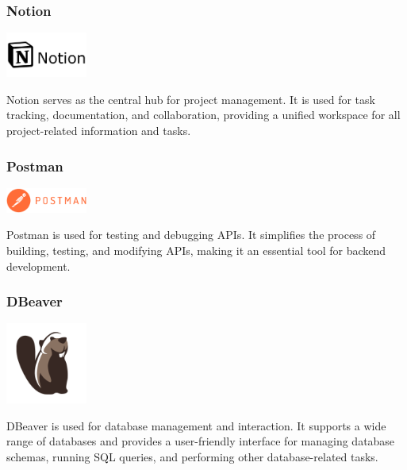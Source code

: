\subsubsection*{Notion}
\begin{center}
\includegraphics[width=0.2\textwidth]{Images/logos/62cc159e150d5de9a3dad5ec.png}
\label{fig:notion}
\end{center}
Notion serves as the central hub for project management. It is used for task tracking, documentation, and collaboration, providing a unified workspace for all project-related information and tasks.

\subsubsection*{Postman}
\begin{center}
\includegraphics[width=0.2\textwidth]{Images/logos/62cc1b6b150d5de9a3dad5f9.png}
\label{fig:postman}
\end{center}
Postman is used for testing and debugging APIs. It simplifies the process of building, testing, and modifying APIs, making it an essential tool for backend development.

\clearpage

\subsubsection*{DBeaver}
\begin{center}
\includegraphics[width=0.2\textwidth]{Images/logos/DBeaver_logo.png}
\label{fig:dbeaver}
\end{center}
DBeaver is used for database management and interaction. It supports a wide range of databases and provides a user-friendly interface for managing database schemas, running SQL queries, and performing other database-related tasks.
